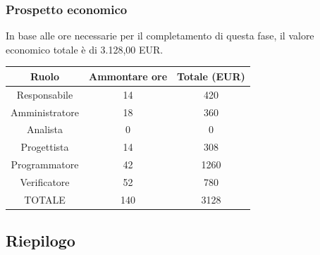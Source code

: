 \subsubsection{Prospetto economico}
In base alle ore necessarie per il completamento di questa fase, il valore economico totale è di 3.128,00 EUR.
\begin{center}
\begin{tabular}{ |c|c|c|  }
 \hline
 Ruolo 		& Ammontare ore 	& Totale (EUR)\\
 \hline
 \hline
 	Responsabile	& 14 	& 420\\
	Amministratore	& 18		& 360\\
	Analista		& 0 		& 0\\
	Progettista		& 14		& 308\\
	Programmatore	& 42		& 1260\\
	Verificatore	& 52 	& 780\\
 \hline\hline
 TOTALE		& 140		& 3128\\
  \hline
\end{tabular}
\end{center}
\newpage
\subsection{Riepilogo}
